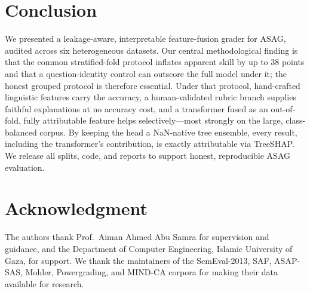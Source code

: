 \documentclass[10pt,twocolumn]{article}
\begin{document}
\section{Conclusion}
\label{sec:conclusion}
We presented a leakage-aware, interpretable feature-fusion grader for ASAG, audited
across six heterogeneous datasets. Our central methodological finding is that the
common stratified-fold protocol inflates apparent skill by up to $38$ points and
that a question-identity control can outscore the full model under it; the honest
grouped protocol is therefore essential. Under that protocol, hand-crafted
linguistic features carry the accuracy, a human-validated rubric branch supplies
faithful explanations at no accuracy cost, and a transformer fused as an
out-of-fold, fully attributable feature helps selectively---most strongly on the
large, class-balanced corpus. By keeping the head a NaN-native tree ensemble, every
result, including the transformer's contribution, is exactly attributable via
TreeSHAP. We release all splits, code, and reports to support honest,
reproducible ASAG evaluation.

\section*{Acknowledgment}
The authors thank Prof.\ Aiman Ahmed Abu Samra for supervision and guidance, and the
Department of Computer Engineering, Islamic University of Gaza, for support. We
thank the maintainers of the SemEval-2013, SAF, ASAP-SAS, Mohler, Powergrading,
and MIND-CA corpora for making their data available for research.



\end{document}
